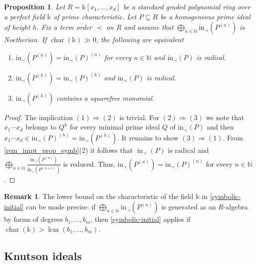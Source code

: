 \documentclass[12pt]{amsart}
\newtheorem{proposition}[proposition]{Proposition}
\theoremstyle{definition}
\newtheorem{remark}[remark]{Remark}
\renewcommand{\(}{\left(}
\renewcommand{\)}{\right)}
\newcommand{\NN}{\mathbb{N} }
\newcommand{\kk}{\mathbb{k}}
\newcommand{\IN}{\operatorname{in}}
\DeclareMathOperator{\chara}{{{char}}}
\renewcommand{\!}[1]{{\color{red}\text{\Huge$\star$ }#1}}
\DeclareMathOperator{\lcm}{{lcm}}
\newcommand{\init}{\mathrm{in}}
\begin{document}
\begin{proposition}\label{symbolic-initial}
	 Let $R=\kk [x_1,\ldots,x_d]$ be a standard graded polynomial ring over a perfect field $\kk$ of prime characteristic. 
Let $P\subseteq R$ be a homogeneous prime ideal of height $h$. Fix a term order $\prec$ on $R$ and  assume that $\bigoplus_{n\in \NN}\init_\prec\left(P^{(n)}\right)$ is Noetherian. If $\chara(\kk)\gg 0$, the following are equivalent
	\begin{enumerate}[\rm (1)]
		\item $\init_\prec\left(P^{(n)}\right)=\init_\prec(P)^{(n)}$ for every $n\in\NN$ and $\init_\prec(P)$ is radical.
		\item $\init_\prec\left(P^{(h)}\right)=\init_\prec(P)^{(h)}$ and $\init_\prec(P)$ is radical.
		\item $\init_\prec\left(P^{(h)}\right)$ contains a squarefree monomial.
	\end{enumerate}
\end{proposition}
\begin{proof}
	The implication $(1)\Rightarrow (2)$ is trivial. For $(2)\Rightarrow (3)$ we note that  $x_1\cdots x_d$ belongs to $Q^h$  for every minimal prime ideal $Q$ of $\init_\prec(P)$ and then $x_1\cdots x_d\in \init_\prec(P)^{(h)}= \init_\prec\left(P^{(h)}\right)$. 
	It remains to show  $(3)\Rightarrow (1)$.  From \autoref{rem_impt_prop_symb}(2) it follows that  $\IN_\prec(P)$ is radical and $\bigoplus_{n\in\NN}\frac{\init_\prec(P^{(n)})}{\init_\prec(P^{(n+1)})}$ is reduced. Thus, $\init_\prec\left(P^{(n)}\right)=\init_\prec(P)^{(n)}$ for every $n\in\NN$  \cite[Corollary 7.10]{DSMNB}. 
\end{proof}

\begin{remark}
The lower bound on the characteristic of the field $\kk $ in \autoref{symbolic-initial} can be made precise: if $\bigoplus_{n\in \NN}\init_\prec(P^{(n)})$ is generated as an $R$-algebra by forms of  degrees $b_1,\ldots ,b_m$, then \autoref{symbolic-initial} applies if  $\chara(\kk)>\lcm(b_1,\ldots ,b_m)$.
\end{remark}





\subsection{Knutson ideals}\label{SubSecKnutson}
\end{document}
